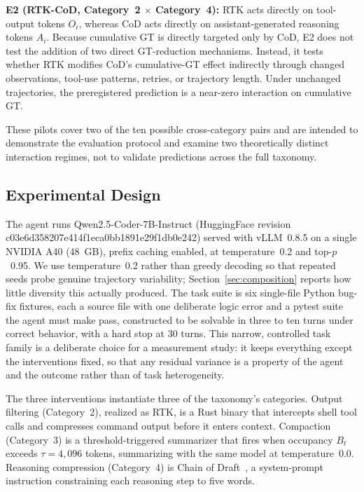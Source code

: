 \documentclass{article}
\begin{document}
\textbf{E2 (RTK-CoD, Category~2 $\times$ Category~4):} RTK acts directly on tool-output tokens $O_i$, whereas CoD acts directly on assistant-generated reasoning tokens $A_i$. Because cumulative GT is directly targeted only by CoD, E2 does not test the addition of two direct GT-reduction mechanisms. Instead, it tests whether RTK modifies CoD's cumulative-GT effect indirectly through changed observations, tool-use patterns, retries, or trajectory length. Under unchanged trajectories, the preregistered prediction is a near-zero interaction on cumulative GT.

These pilots cover two of the ten possible cross-category pairs and are intended to demonstrate the evaluation protocol and examine two theoretically distinct interaction regimes, not to validate predictions across the full taxonomy.

\subsection{Experimental Design}

The agent runs Qwen2.5-Coder-7B-Instruct (HuggingFace revision c03e6d358207e414f1eca0bb1891e29f1db0e242) served with vLLM~0.8.5 on a single NVIDIA A40 (48~GB), prefix caching enabled, at temperature~0.2 and top-$p$~0.95. We use temperature~0.2 rather than greedy decoding so that repeated seeds probe genuine trajectory variability; Section~\ref{sec:composition} reports how little diversity this actually produced. The task suite is six single-file Python bug-fix fixtures, each a source file with one deliberate logic error and a pytest suite the agent must make pass, constructed to be solvable in three to ten turns under correct behavior, with a hard stop at 30 turns. This narrow, controlled task family is a deliberate choice for a measurement study: it keeps everything except the interventions fixed, so that any residual variance is a property of the agent and the outcome rather than of task heterogeneity.

The three interventions instantiate three of the taxonomy's categories. Output filtering (Category~2), realized as RTK, is a Rust binary that intercepts shell tool calls and compresses command output before it enters context. Compaction (Category~3) is a threshold-triggered summarizer that fires when occupancy $B_t$ exceeds $\tau=4{,}096$ tokens, summarizing with the same model at temperature~0.0. Reasoning compression (Category~4) is Chain of Draft~\citep{chainofdraft2025}, a system-prompt instruction constraining each reasoning step to five words.
\end{document}
